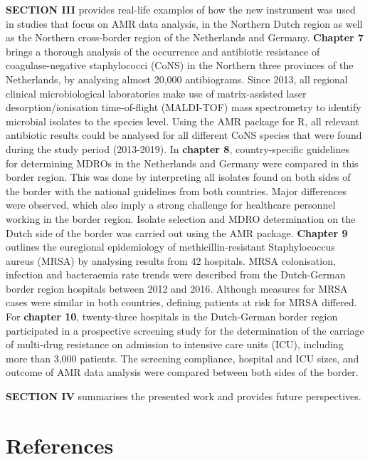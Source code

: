\documentclass[
]{book}
\begin{document}
\textbf{SECTION III} provides real-life examples of how the new instrument was used in studies that focus on AMR data analysis, in the Northern Dutch region as well as the Northern cross-border region of the Netherlands and Germany. \textbf{Chapter 7} brings a thorough analysis of the occurrence and antibiotic resistance of coagulase-negative staphylococci (CoNS) in the Northern three provinces of the Netherlands, by analysing almost 20,000 antibiograms. Since 2013, all regional clinical microbiological laboratories make use of matrix-assisted laser desorption/ionisation time-of-flight (MALDI-TOF) mass spectrometry to identify microbial isolates to the species level. Using the AMR package for R, all relevant antibiotic results could be analysed for all different CoNS species that were found during the study period (2013-2019). In \textbf{chapter 8}, country-specific guidelines for determining MDROs in the Netherlands and Germany were compared in this border region. This was done by interpreting all isolates found on both sides of the border with the national guidelines from both countries. Major differences were observed, which also imply a strong challenge for healthcare personnel working in the border region. Isolate selection and MDRO determination on the Dutch side of the border was carried out using the AMR package. \textbf{Chapter 9} outlines the euregional epidemiology of methicillin-resistant Staphylococcus aureus (MRSA) by analysing results from 42 hospitals. MRSA colonisation, infection and bacteraemia rate trends were described from the Dutch-German border region hospitals between 2012 and 2016. Although measures for MRSA cases were similar in both countries, defining patients at risk for MRSA differed. For \textbf{chapter 10}, twenty-three hospitals in the Dutch-German border region participated in a prospective screening study for the determination of the carriage of multi-drug resistance on admission to intensive care units (ICU), including more than 3,000 patients. The screening compliance, hospital and ICU sizes, and outcome of AMR data analysis were compared between both sides of the border.

\textbf{SECTION IV} summarises the presented work and provides future perspectives.

\hypertarget{references}{%
\section*{References}\label{references}}
\end{document}
